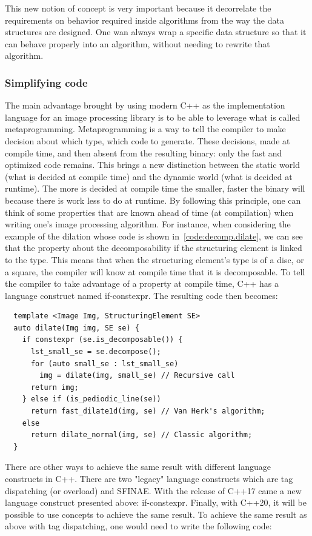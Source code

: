 This new notion of concept is very important because it decorrelate the requirements on behavior required inside
algorithms from the way the data structures are designed. One wan always wrap a specific data structure so that it can
behave properly into an algorithm, without needing to rewrite that algorithm.

\subsubsection{Simplifying code}
\label{subsec:simplifying}

The main advantage brought by using modern C++ as the implementation language for an image processing library is to be
able to leverage what is called metaprogramming. Metaprogramming is a way to tell the compiler to make decision about
which type, which code to generate. These decisions, made at compile time, and then absent from the resulting binary:
only the fast and optimized code remains. This brings a new distinction between the static world (what is decided at
compile time) and the dynamic world (what is decided at runtime). The more is decided at compile time the smaller,
faster the binary will because there is work less to do at runtime. By following this principle, one can think of some
properties that are known ahead of time (at compilation) when writing one's image processing algorithm. For instance,
when considering the example of the dilation whose code is shown in~\ref{code:decomp.dilate}, we can see that the
property about the decomposability if the structuring element is linked to the type. This means that when the
structuring element's type is of a disc, or a square, the compiler will know at compile time that it is decomposable. To
tell the compiler to take advantage of a property at compile time, C++ has a language construct named if-constexpr. The
resulting code then becomes:

\begin{verbatim}
  template <Image Img, StructuringElement SE>
  auto dilate(Img img, SE se) {
    if constexpr (se.is_decomposable()) {
      lst_small_se = se.decompose();
      for (auto small_se : lst_small_se)
        img = dilate(img, small_se) // Recursive call
      return img;
    } else if (is_pediodic_line(se))
      return fast_dilate1d(img, se) // Van Herk's algorithm;
    else
      return dilate_normal(img, se) // Classic algorithm;
  }
\end{verbatim}

There are other ways to achieve the same result with different language constructs in C++. There are two "legacy"
language constructs which are tag dispatching (or overload) and SFINAE. With the release of C++17 came a new language
construct presented above: if-constexpr. Finally, with C++20, it will be possible to use concepts to achieve the same
result. To achieve the same result as above with tag dispatching, one would need to write the following code:

